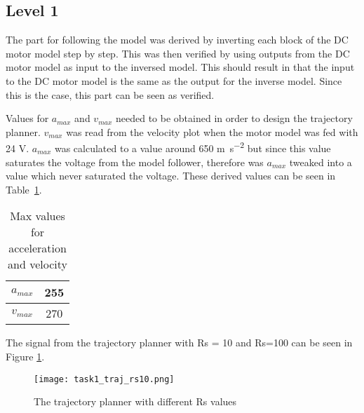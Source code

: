 \subsection*{Level 1}
The part for following the model was derived by inverting each block of the DC
motor model step by step. This was then verified by using outputs from the DC
motor model as input to the inversed model. This should result in that
the input to the DC motor model is the same as the output for the
inverse model. Since this is the case, this part can be seen as
verified. \\ 
\par Values for $a_{max}$ and $v_{max}$ needed to be
obtained in order to design the trajectory planner. $v_{max}$ was read
from the velocity plot when the motor model was fed with 24 V. $a_{max}$
was calculated to a value around 650 \si{\meter\per\square\second} but
since this value saturates the voltage from the model follower,
therefore was $a_{max}$ tweaked into a value which never saturated the
voltage. These derived values can be seen in Table~\ref{tbl:table1}.
\begin{table}[H]
    \centering
    \caption{Max values for acceleration and velocity}
	\begin{tabular}{| c | c |}
        \hline
	    $a_{max}$ & 255 \\ \hline
		$v_{max}$ & 270 \\ 
		\hline
	\end{tabular}
        \label{tbl:table1}
\end{table}
The signal from the trajectory planner with Rs = 10 and Rs=100 can be seen in Figure \ref{fig:task2_pos}.

\begin{figure}[H]
	\begin{center}
	
		\texttt{[image: task1\_traj\_rs10.png]}
		\caption{The trajectory planner with different Rs values}
		\label{fig:task2_pos}
	\end{center}
\end{figure}
